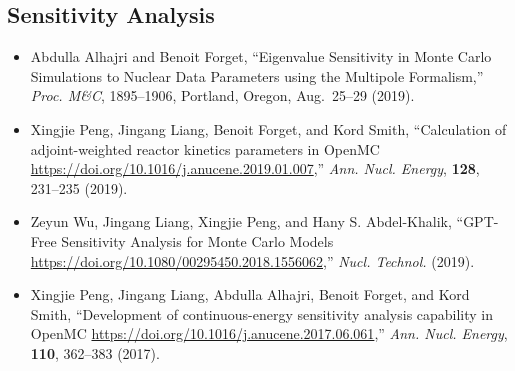 \subsection{Sensitivity Analysis}

\begin{itemize}

\item Abdulla Alhajri and Benoit Forget, ``Eigenvalue Sensitivity in Monte Carlo
Simulations to Nuclear Data Parameters using the Multipole Formalism,'' \textit{Proc.
M\&C}, 1895--1906, Portland, Oregon, Aug.\ 25--29 (2019).

\item Xingjie Peng, Jingang Liang, Benoit Forget, and Kord Smith, ``Calculation of
adjoint-weighted reactor kinetics parameters in OpenMC
\url{https://doi.org/10.1016/j.anucene.2019.01.007},'' \textit{Ann. Nucl. Energy},
\textbf{128}, 231--235 (2019).

\item Zeyun Wu, Jingang Liang, Xingjie Peng, and Hany S. Abdel-Khalik, ``GPT-Free
Sensitivity Analysis for Monte Carlo Models
\url{https://doi.org/10.1080/00295450.2018.1556062},'' \textit{Nucl. Technol.} (2019).

\item Xingjie Peng, Jingang Liang, Abdulla Alhajri, Benoit Forget, and Kord Smith,
``Development of continuous-energy sensitivity analysis capability in OpenMC
\url{https://doi.org/10.1016/j.anucene.2017.06.061},'' \textit{Ann. Nucl. Energy},
\textbf{110}, 362--383 (2017).

\end{itemize}